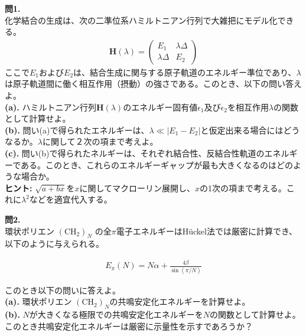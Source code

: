\documentclass{jlreq}
\begin{document}
\noindent
\textbf{問1.}\\

\noindent
化学結合の生成は、次の二準位系ハミルトニアン行列で大雑把にモデル化できる。
\begin{eqnarray}
    \mathbf{H}(\lambda)=
    \begin{pmatrix}
    E_1 & \lambda\Delta \\ 
    \lambda\Delta & E_2
    \end{pmatrix}
\end{eqnarray}
ここで$E_1$および$E_2$は、結合生成に関与する原子軌道のエネルギー準位であり、$\lambda$は原子軌道間に働く相互作用（摂動）の強さである。このとき、以下の問い答えよ。\\

\noindent
\textbf{(a).} ハミルトニアン行列$\mathbf{H}(\lambda)$のエネルギー固有値$\epsilon_1$及び$\epsilon_2$を相互作用$\lambda$の関数として計算せよ。\\
\noindent
\textbf{(b).} 問い(a)で得られたエネルギーは、$\lambda \ll |E_1-E_2|$と仮定出来る場合にはどうなるか。$\lambda$に関して２次の項まで考えよ。\\
\noindent
\textbf{(c).} 問い(b)で得られたネルギーは、それぞれ結合性、反結合性軌道のエネルギーである。このとき、これらのエネルギーギャップが最も大きくなるのはどのような場合か。\\

\noindent
\textbf{ヒント:} $\sqrt{a+bx}$を$x$に関してマクローリン展開し、$x$の1次の項まで考える。これに$\lambda^2$などを適宜代入する。

\clearpage

\noindent
\textbf{問2.}\\

\noindent
環状ポリエン $(\text{CH}_2)_N$ の全$\pi$電子エネルギーはH\"uckel法では厳密に計算でき、以下のように与えられる。

\begin{eqnarray}
    E_\pi(N)=N\alpha+\frac{4\beta}{\sin(\pi/N)}
\end{eqnarray}

\noindent
このとき以下の問いに答えよ。\\

\noindent
\textbf{(a).} 環状ポリエン $(\text{CH}_2)_N$の共鳴安定化エネルギーを計算せよ。\\
\noindent
\textbf{(b).} $N$が大きくなる極限での共鳴安定化エネルギーを$N$の関数として計算せよ。このとき共鳴安定化エネルギーは厳密に示量性を示すであろうか？\\
\end{document}
